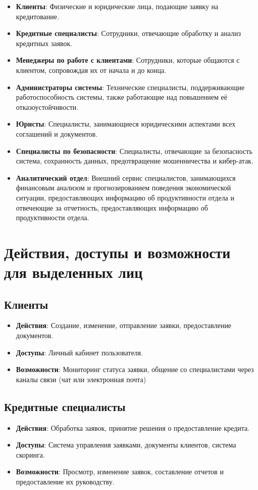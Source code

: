 \documentclass[20pt]{article}
\begin{document}
\begin{itemize}
    \item \textbf{Клиенты}: Физические и юридические лица, подающие заявку на кредитование.
    \item \textbf{Кредитные специалисты}: Сотрудники, отвечающие обработку и анализ кредитных заявок.
    \item \textbf{Менеджеры по работе с клиентами}: Сотрудники, которые общаются с клиентом, сопровождая их от начала и до конца.
    \item \textbf{Администраторы системы}: Технические специалисты, поддерживающие работоспособность системы, также работающие над повышением её отказоустойчивости.
    \item \textbf{Юристы}: Специалисты, занимающиеся юридическими аспектами всех соглашений и документов. 
    \item \textbf{Специалисты по безопасности}: Специалисты, отвечающие за безопасность система, сохранность данных, предотвращение мошенничества и кибер-атак.
    \item \textbf{Аналитический отдел}: Внешний сервис специалистов, занимающихся финансовым анализом и прогнозированием поведения экономической ситуации, предоставляющих информацию об продуктивности отдела и отвечеющие за отчетность, предоставляющих информацию об продуктивности отдела.
\end{itemize}

\section{Действия, доступы и возможности для выделенных лиц}

\subsection{Клиенты}
\begin{itemize}
    \item \textbf{Действия}: Создание, изменение, отправление заявки, предоставление документов.
    \item \textbf{Доступы}: Личный кабинет пользователя.
    \item \textbf{Возможности}: Мониторинг статуса заявки, общение со специалистами через каналы связи (чат или электронная почта)
\end{itemize}

\subsection{Кредитные специалисты}
\begin{itemize}
    \item \textbf{Действия}: Обработка заявок, принятие решения о предоставление кредита.
    \item \textbf{Доступы}: Система управления заявками, документы клиентов, система скоринга.
    \item \textbf{Возможности}: Просмотр, изменение заявок, составление отчетов и предоставление их руководству.
\end{itemize}
\end{document}
